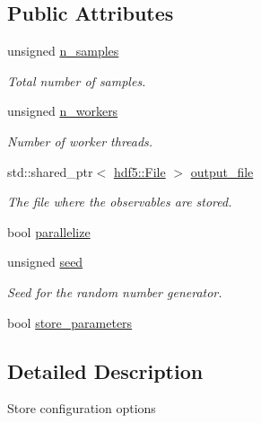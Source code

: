 \subsection*{Public Attributes}
\begin{DoxyCompactItemize}
\item 
unsigned \hyperlink{structeos_1_1PriorSampler_1_1Config_a2db80db4647764792f4370590e0cfb38}{n\_\-samples}
\begin{DoxyCompactList}\small\item\em Total number of samples. \item\end{DoxyCompactList}\item 
unsigned \hyperlink{structeos_1_1PriorSampler_1_1Config_a4bb4bb97708f5dc7cd8414489a2808c9}{n\_\-workers}
\begin{DoxyCompactList}\small\item\em Number of worker threads. \item\end{DoxyCompactList}\item 
std::shared\_\-ptr$<$ \hyperlink{classeos_1_1hdf5_1_1File}{hdf5::File} $>$ \hyperlink{structeos_1_1PriorSampler_1_1Config_ab11de7880341b9e9ea13e9332f574483}{output\_\-file}
\begin{DoxyCompactList}\small\item\em The file where the observables are stored. \item\end{DoxyCompactList}\item 
bool \hyperlink{structeos_1_1PriorSampler_1_1Config_ac59ca5849359f3bc11188e7de73c93c2}{parallelize}
\item 
unsigned \hyperlink{structeos_1_1PriorSampler_1_1Config_a9f056d7db9c1a40a51520534ab13ee95}{seed}
\begin{DoxyCompactList}\small\item\em Seed for the random number generator. \item\end{DoxyCompactList}\item 
bool \hyperlink{structeos_1_1PriorSampler_1_1Config_aa572418843b732c559f5b9612d4bf2fa}{store\_\-parameters}
\end{DoxyCompactItemize}


\subsection{Detailed Description}
Store configuration options 

